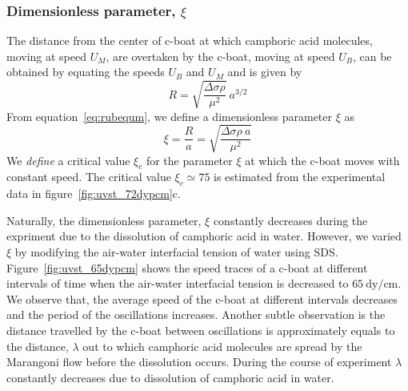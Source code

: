 \documentclass[aps, twocolumn, floatfix, superscriptaddress]{revtex4}
\begin{document}
\subsubsection{Dimensionless parameter, $\xi$}
The distance from the center of c-boat at which camphoric acid molecules, moving at speed $U_{M}$, are overtaken by the c-boat, moving at speed $U_{B}$, can be obtained by equating the speeds $U_{B}$ and $U_{M}$ and is given by
\begin{equation}\label{eq:rubequm}
R = \sqrt{\frac{\Delta\sigma\rho}{\mu^{2}}}\ a^{3/2}
\end{equation}
From equation~\ref{eq:rubequm}, we define a dimensionless parameter $\xi$ as
\begin{equation}
\xi = \frac{R}{a} = \sqrt{\frac{\Delta\sigma\rho\ a}{\mu^{2}}}
\end{equation}
We \emph{define} a critical value $\xi_{c}$ for the parameter $\xi$ at which the c-boat moves with constant speed. The critical value $\xi_{c} \simeq 75$ is estimated from the experimental data in figure~\ref{fig:uvst_72dypcm}c. \par
Naturally, the dimensionless parameter, $\xi$ constantly decreases during the expriment due to the dissolution of camphoric acid in water. However, we varied $\xi$ by modifying the air-water interfacial tension of water using SDS. Figure~\ref{fig:uvst_65dypcm} shows the speed traces of a c-boat at different intervals of time when the air-water interfacial tension is decreased to $65\ \text{dy/cm}$. We observe that, the average speed of the c-boat at different intervals decreases and the period of the oscillations increases. Another subtle observation is the distance travelled by the c-boat between oscillations is approximately equals to the distance, $\lambda$ out to which camphoric acid molecules are spread by the Marangoni flow before the dissolution occurs. During the course of experiment $\lambda$ constantly decreases due to dissolution of camphoric acid in water. 
\end{document}
